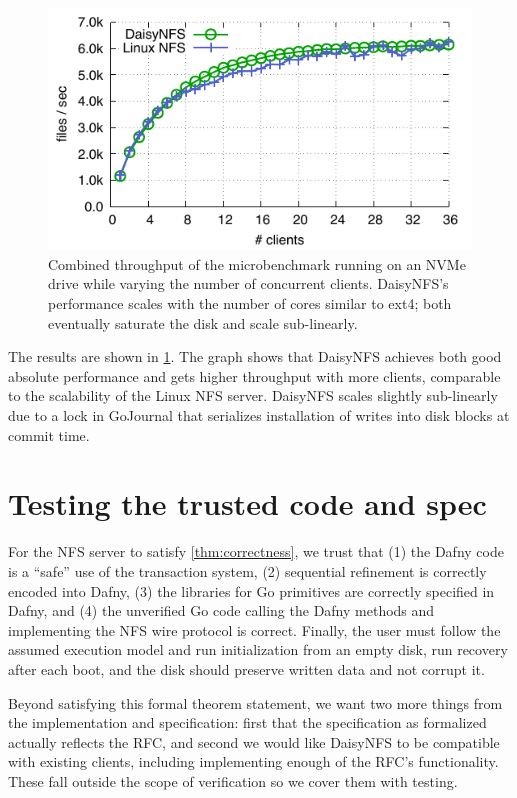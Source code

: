 \begin{figure}
  \includegraphics{daisy-nfs/fig/scale.pdf}
  \caption[Concurrent smallfile performance]%
{Combined throughput of the  microbenchmark running on
    an NVMe drive while
    varying the number of concurrent clients. DaisyNFS's performance scales with the
    number of cores similar to ext4; both eventually saturate the disk and scale
    sub-linearly.}
  \label{fig:eval:scale}
\end{figure}

The results are shown in \cref{fig:eval:scale}. The graph shows that DaisyNFS
achieves both good absolute performance and gets higher throughput with more
clients, comparable to the scalability of the Linux NFS server.
DaisyNFS scales slightly sub-linearly due to a lock in GoJournal that serializes
installation of writes into disk blocks at commit time.

\section{Testing the trusted code and spec}

For the NFS server to satisfy \cref{thm:correctness}, we trust that (1) the
Dafny code is a ``safe'' use of the transaction system, (2) sequential
refinement is correctly encoded into Dafny, (3) the libraries for Go primitives
are correctly specified in Dafny, and (4) the unverified Go code calling the
Dafny methods and implementing the NFS wire protocol is correct. Finally, the
user must follow the assumed execution model and run initialization from an
empty disk, run recovery after each boot, and the disk should preserve written
data and not corrupt it.

Beyond satisfying this formal theorem statement, we want two more things from
the implementation and specification: first that the specification as formalized
actually reflects the RFC, and second we would like DaisyNFS to be compatible
with existing clients, including implementing enough of the RFC's functionality.
These fall outside the scope of verification so we cover them with testing.

